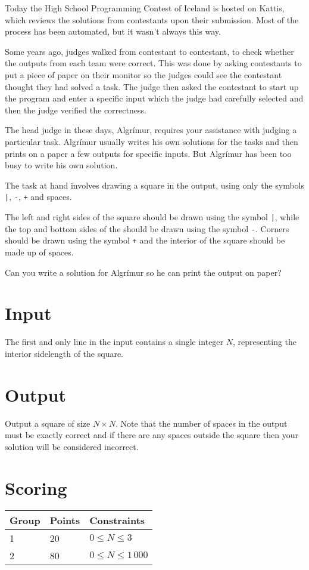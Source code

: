 
Today the High School Programming Contest of Iceland is hosted on Kattis, which reviews the solutions from contestants upon their submission.
Most of the process has been automated, but it wasn't always this way.

Some years ago, judges walked from contestant to contestant, to check whether the outputs from each team were correct.
This was done by asking contestants to put a piece of paper on their monitor so the judges could see the contestant thought they had
solved a task. The judge then asked the contestant to start up the program and enter a specific input which the judge had carefully selected
and then the judge verified the correctness.

The head judge in these days, Algrímur, requires your assistance with judging a particular task.
Algrímur usually writes his own solutions for the tasks and then prints on a paper a few  outputs for specific inputs.
But Algrímur has been too busy to write his own solution.

The task at hand involves drawing a square in the output, using only the symbols \texttt{|}, \texttt{-}, \texttt{+} and spaces.

The left and right sides of the square should be drawn using the symbol \texttt{|}, while the top and bottom sides of the should be drawn using the symbol \texttt{-}.
Corners should be drawn using the symbol \texttt{+} and the interior of the square should be made up of spaces.

Can you write a solution for Algrímur so he can print the output on paper?

\section*{Input}
The first and only line in the input contains a single integer $N$, representing the interior sidelength of the square.

\section*{Output}
Output a square of size $N \times N$.
Note that the number of spaces in the output must be exactly correct and if there are any spaces outside the square then your solution will be considered incorrect.

\section*{Scoring}
\begin{tabular}{|l|l|l|}
\hline
Group & Points & Constraints \\ \hline
1     & 20     & $0 \leq N \leq 3$ \\ \hline
2     & 80     & $0 \leq N \leq 1\,000$ \\ \hline
\end{tabular}

